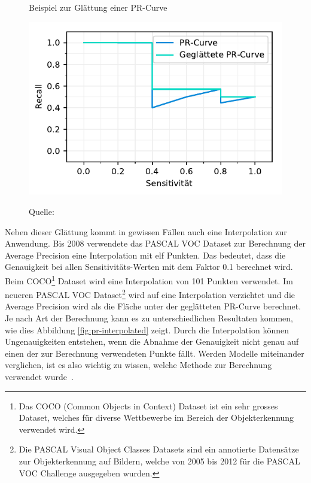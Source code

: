 \begin{figure}[h!]
    \captionsetup{width=.9\linewidth}
    \caption{Beispiel zur Glättung einer PR-Curve}
    \label{fig:pr-smoothed}
    \centering
    \includegraphics[scale=1]{graphics/matplot/ap__pr-smoothed.pdf}\\
    \caption*{Quelle: \textcite{AP}}
\end{figure}

Neben dieser Glättung kommt in gewissen Fällen auch eine Interpolation zur Anwendung. Bis 2008 verwendete das PASCAL VOC Dataset zur Berechnung der Average Precision eine Interpolation mit elf Punkten. Das bedeutet, dass die Genauigkeit bei allen Sensitivitäts-Werten mit dem Faktor 0.1 berechnet wird. Beim COCO\footnote{Das COCO (Common Objects in Context) Dataset ist ein sehr grosses Dataset, welches für diverse Wettbewerbe im Bereich der Objekterkennung verwendet wird.} Dataset wird eine Interpolation von 101 Punkten verwendet. Im neueren PASCAL VOC Dataset\footnote{Die PASCAL Visual Object Classes Datasets sind ein annotierte Datensätze zur Objekterkennung auf Bildern, welche von 2005 bis 2012 für die PASCAL VOC Challenge ausgegeben wurden.} wird auf eine Interpolation verzichtet und die Average Precision wird als die Fläche unter der geglätteten PR-Curve berechnet. Je nach Art der Berechnung kann es zu unterschiedlichen Resultaten kommen, wie dies Abbildung \ref{fig:pr-interpolated} zeigt. Durch die Interpolation können Ungenauigkeiten entstehen, wenn die Abnahme der Genauigkeit nicht genau auf einen der zur Berechnung verwendeten Punkte fällt. Werden Modelle miteinander verglichen, ist es also wichtig zu wissen, welche Methode zur Berechnung verwendet wurde~\autocite{AP}.

